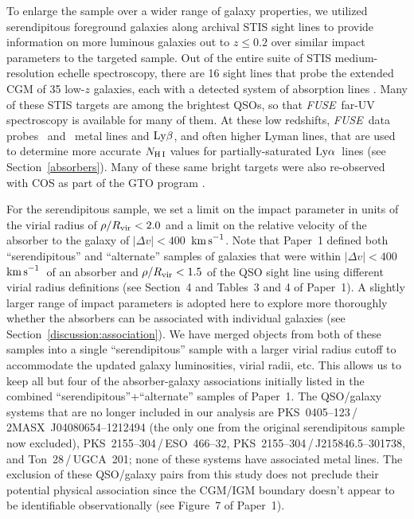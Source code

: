 \documentclass[twocolumn,twocolappendix,tighten,times]{aastex6}
\newcommand{\CIII}{\ion{C}{3}}
\newcommand{\OVI}{\ion{O}{6}}
\newcommand{\fuse}{{\sl FUSE}}
\newcommand{\kms}{\ensuremath{{\rm km\,s}^{-1}}}
\newcommand{\lya}{\ensuremath{{\rm Ly}\alpha}}
\newcommand{\lyb}{\ensuremath{{\rm Ly}\beta}}
\begin{document}
To enlarge the sample over a wider range of galaxy properties, we
utilized serendipitous foreground galaxies along archival STIS
sight lines to provide information on more luminous galaxies out to
$z\leq0.2$ over similar impact parameters to the targeted sample.  
Out of the entire suite of STIS medium-resolution echelle spectroscopy, 
there are 16 sight lines that probe the extended CGM of 35 low-$z$ 
galaxies, each with a detected system of absorption lines 
\citep[see][for a definition of ``systems of absorbers'']{danforth16}. Many 
of these STIS targets are among the brightest QSOs, so that \fuse\ far-UV 
spectroscopy is available for many of them. At these low redshifts, \fuse\ 
data probes \OVI\ and \CIII\ metal lines and \lyb, and often higher Lyman lines, 
that are used to determine more accurate $N_{\rm H\,I}$ values for 
partially-saturated \lya\ lines (see Section~\ref{absorbers}).  Many of these 
same bright targets were also re-observed with COS as part of the GTO program 
\citep[see][]{savage14}.

For the serendipitous sample, we
set a limit on the impact parameter in units of the virial radius of
$\rho/R_{\rm vir} < 2.0$ and a limit on the relative velocity of the
absorber to the galaxy of $|\Delta v| < 400$~\kms. Note that Paper~1
defined both ``serendipitous'' and  ``alternate'' samples of galaxies
that were within $|\Delta v| < 400$~\kms\ of an  absorber and
$\rho/R_{\rm vir} < 1.5$ of the QSO sight line using different virial
radius definitions (see Section~4 and Tables~3 and 4 of Paper~1). 
A slightly larger range of impact parameters is adopted here to 
explore more thoroughly whether the absorbers can be associated with 
individual galaxies (see Section~\ref{discussion:association}).
We have merged  objects from both of these samples into a single
``serendipitous'' sample  with a larger virial radius cutoff
to accommodate the  updated galaxy luminosities, virial
radii, etc. This allows us to keep all but four of the
absorber-galaxy associations initially listed in the combined
``serendipitous''+``alternate'' samples of Paper~1. The QSO/galaxy systems that 
are no longer included in our analysis are
PKS~0405--123\,/\,2MASX~J04080654--1212494 (the only one from the
original serendipitous sample now excluded), PKS~2155--304\,/\,ESO~466--32,
PKS~2155--304\,/\,J215846.5--301738, and Ton~28\,/\,UGCA~201; none of these 
systems have associated  metal lines. The exclusion of these QSO/galaxy pairs 
from this study does not preclude their potential physical association since 
the CGM/IGM boundary doesn't appear to be identifiable observationally (see 
Figure~7 of Paper~1).
\end{document}
